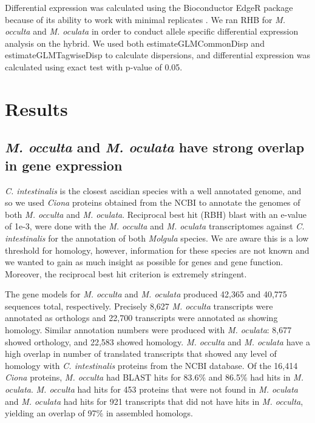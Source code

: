 Differential expression was calculated using the Bioconductor EdgeR package because of its ability to work with minimal replicates \cite{robinson_edger:_2010}. We ran RHB  for \textit{M. occulta} and \textit{M. oculata} in order to conduct allele specific differential expression analysis on the hybrid. We used both estimateGLMCommonDisp and estimateGLMTagwiseDisp to calculate dispersions, and differential expression was calculated using exact test with p-value of 0.05. 

\section{Results}
\subsection{\textit{M. occulta} and \textit{M. oculata} have strong overlap in gene expression}
\textit{C. intestinalis} is the closest ascidian species with a well annotated genome, and so we used \textit{Ciona} proteins obtained from the NCBI to annotate the genomes of both \textit{M. occulta} and \textit{M. oculata}. Reciprocal best hit (RBH) blast with an e-value of 1e-3, were done with the \textit{M. occulta} and \textit{M. oculata} transcriptomes against \textit{C. intestinalis} for the annotation of both \textit{Molgula} species.  We are aware this is a low threshold for homology, however, information for these species are not known and we wanted to gain as much insight as possible for genes and gene function. Moreover, the reciprocal best hit criterion is extremely stringent.

The gene models for \textit{M. occulta} and \textit{M. oculata} produced 42,365 and 40,775 sequences total, respectively. Precisely 8,627 \textit{M. occulta} transcripts were annotated as orthologs and 22,700 transcripts were annotated as showing homology. Similar annotation numbers were produced with \textit{M. oculata}: 8,677 showed orthology, and 22,583 showed homology. \textit{M. occulta} and \textit{M. oculata} have a high overlap in number of translated transcripts that showed any level of homology with \textit{C. intestinalis} proteins from the NCBI database. Of the 16,414 {\em Ciona} proteins, \textit{M. occulta} had BLAST hits for 83.6\% and 86.5\% had hits in \textit{M. oculata}. \textit{M. occulta} had hits for 453 proteins that were not found in \textit{M. oculata} and \textit{M. oculata} had hits for 921 transcripts that did not have hits in \textit{M. occulta}, yielding an overlap of 97\% in assembled homologs.

